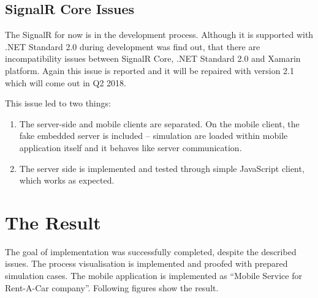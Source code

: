 \subsection{SignalR Core Issues}
The SignalR for now is in the development process. Although it is supported with .NET Standard 2.0 during development was find out, that there are incompatibility issues between SignalR Core, .NET Standard 2.0 and Xamarin platform. Again this issue is reported and it will be repaired with version 2.1 which will come out in Q2 2018.

This issue led to two things:
\begin{enumerate}
\item The server-side and mobile clients are separated. On the mobile client, the fake embedded server is included -- simulation are loaded within mobile application itself and it behaves like server communication. 
\item The server side is implemented and tested through simple JavaScript client, which works as expected. 
\end{enumerate}
\section{The Result}
The goal of implementation was successfully completed, despite the described issues. The process visualisation is implemented and proofed with prepared simulation cases. The mobile application is implemented as ``Mobile Service for Rent-A-Car  company''. Following figures show the result. 


